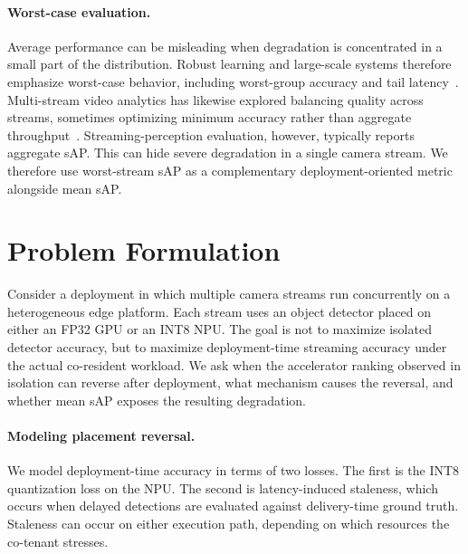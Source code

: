 \documentclass[runningheads]{llncs}
\begin{document}
\paragraph{Worst-case evaluation.}
Average performance can be misleading when degradation is concentrated in a small part of the distribution. Robust learning and large-scale systems therefore emphasize worst-case behavior, including worst-group accuracy and tail latency~\cite{groupdro,cvar,tailatscale}. Multi-stream video analytics has likewise explored balancing quality across streams, sometimes optimizing minimum accuracy rather than aggregate throughput~\cite{biswift,videoedge}. Streaming-perception evaluation, however, typically reports aggregate sAP. This can hide severe degradation in a single camera stream. We therefore use worst-stream sAP as a complementary deployment-oriented metric alongside mean sAP.


\section{Problem Formulation}
\label{sec:problem}

Consider a deployment in which multiple camera streams run concurrently on a heterogeneous edge platform. Each stream uses an object detector placed on either an FP32 GPU or an INT8 NPU. The goal is not to maximize isolated detector accuracy, but to maximize deployment-time streaming accuracy under the actual co-resident workload. We ask when the accelerator ranking observed in isolation can reverse after deployment, what mechanism causes the reversal, and whether mean sAP exposes the resulting degradation.

\paragraph{Modeling placement reversal.}
We model deployment-time accuracy in terms of two losses. The first is the INT8 quantization loss on the NPU. The second is latency-induced staleness, which occurs when delayed detections are evaluated against delivery-time ground truth. Staleness can occur on either execution path, depending on which resources the co-tenant stresses.
\end{document}
